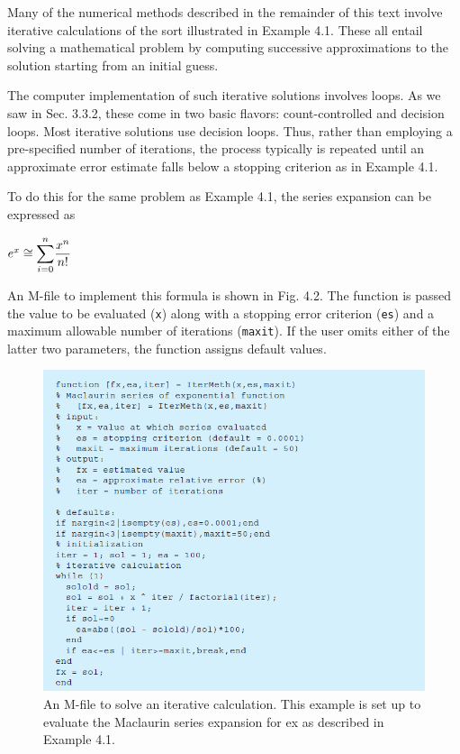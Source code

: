 \documentclass[../main.tex]{subfiles}
\begin{document}
\noindent
Many of the numerical methods described in the remainder of this text involve iterative
calculations of the sort illustrated in Example 4.1. These all entail solving a mathematical
problem by computing successive approximations to the solution starting from an initial
guess.

The computer implementation of such iterative solutions involves loops. As we saw in
Sec. 3.3.2, these come in two basic flavors: count-controlled and decision loops. Most iterative
solutions use decision loops. Thus, rather than employing a pre-specified number of
iterations, the process typically is repeated until an approximate error estimate falls below
a stopping criterion as in Example 4.1.

To do this for the same problem as Example 4.1, the series expansion can be expressed
as
\newline

$e^x\cong \mathlarger{\sum}_{i=0}^{n}\dfrac{x^n}{n!}$
\newline

\noindent
An M-file to implement this formula is shown in Fig. 4.2. The function is passed the value
to be evaluated (\texttt{x}) along with a stopping error criterion (\texttt{es}) and a maximum allowable
number of iterations (\texttt{maxit}). If the user omits either of the latter two parameters, the function
assigns default values.
\newline

\begin{figure}[h]
    \includegraphics{./images/fig_4_2}
    \caption{An M-file to solve an iterative calculation. This example is set up to evaluate the Maclaurin series
    expansion for ex as described in Example 4.1.}
\end{figure}
\end{document}
